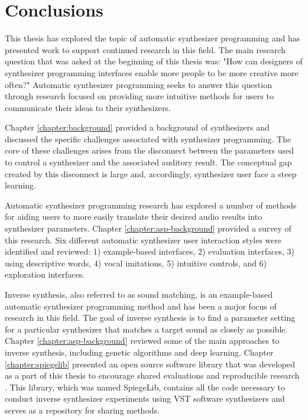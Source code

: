 \chapter{Conclusions} %
This thesis has explored the topic of automatic synthesizer programming and has presented work to support continued research in this field. The main research question that was asked at the beginning of this thesis was: "How can designers of synthesizer programming interfaces enable more people to be more creative more often?" Automatic synthesizer programming seeks to answer this question through research focused on providing more intuitive methods for users to communicate their ideas to their synthesizers.

Chapter \ref{chapter:background} provided a background of synthesizers and discussed the specific challenges associated with synthesizer programming. The core of these challenges arises from the disconnect between the parameters used to control a synthesizer and the associated auditory result. The conceptual gap created by this disconnect is large and, accordingly, synthesizer user face a steep learning. 

Automatic synthesizer programming research has explored a number of methods for aiding users to more easily translate their desired audio results into synthesizer parameters. Chapter \ref{chapter:asp-background} provided a survey of this research. Six different automatic synthesizer user interaction styles were identified and reviewed: 1) example-based interfaces, 2) evaluation interfaces, 3) using descriptive words, 4) vocal imitations, 5) intuitive controls, and 6) exploration interfaces.

Inverse synthesis, also referred to as sound matching, is an example-based automatic synthesizer programming method and has been a major focus of research in this field. The goal of inverse synthesis is to find a parameter setting for a particular synthesizer that matches a target sound as closely as possible. Chapter \ref{chapter:asp-background} reviewed some of the main approaches to inverse synthesis, including genetic algorithms and deep learning. Chapter \ref{chapter:spiegelib} presented an open source software library that was developed as a part of this thesis to encourage shared evaluations and reproducible research \cite{vandewalle2009reproducible}. This library, which was named SpiegeLib, contains all the code necessary to conduct inverse synthesizer experiments using VST software synthesizers and serves as a repository for sharing methods.

